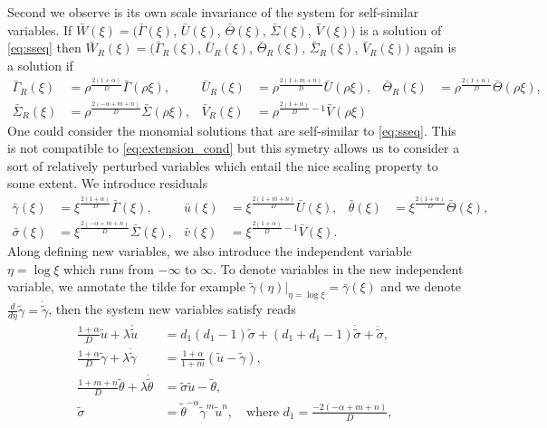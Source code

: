\documentclass[a4paper,11pt]{article}
\def\blue{\color{blue}}
\def\bG{{\bar{\Gamma}}}
\def\bV{{\bar{V}}}
\def\bTh{{\bar{\Theta}}}
\def\bS{{\bar{\Sigma}}}
\def\bU{{\bar{U}}}
\def\bg{{\bar{\gamma}}}
\def\bv{{\bar{v}}}
\def\bth{{\bar{\theta}}}
\def\bs{{\bar{\sigma}}}
\def\bu{{\bar{u}}}
\def\tg{{\tilde{\gamma}}}
\def\tth{{\tilde{\theta}}}
\def\ts{{\tilde{\sigma}}}
\def\tu{{\tilde{u}}}
\theoremstyle{remark}
\begin{document}
Second we observe is its own scale invariance of the system for self-similar variables. If $\bar{W}(\xi)=\big(\bG(\xi)$, $\bU(\xi)$, $\bTh(\xi)$, $\bS(\xi)$, $\bV(\xi)\big)$ is a solution of \eqref{eq:sseq} then $\bar{W}_R(\xi)=\big(\bG _R(\xi)$, $\bU_R(\xi)$, $\bTh_R(\xi)$, $\bS_R(\xi)$, $\bV_R(\xi)\big)$ again is a solution if
{\blue
\begin{align*}
\bG _R(\xi)&=\rho^ \frac{2(1+ \alpha)}{D}\bG(\rho\xi), & \bU _R(\xi) &= \rho^ \frac{2(1+ m+n)}{D}\bU(\rho\xi), & 
\bTh _R(\xi)&=\rho^ \frac{2(1+ \alpha)}{D}\bTh(\rho\xi), \\
\bS _R(\xi)&=\rho^ \frac{2(-\alpha+m+n)}{D}\bS(\rho\xi), & \bV _R(\xi) &=\rho^ {\frac{2(1+ \alpha)}{D}-1}\bV(\rho\xi)
\end{align*}
}
One could consider the monomial solutions that are self-similar to \eqref{eq:sseq}. This is not compatible to \eqref{eq:extension_cond} but this symetry allows us to consider a sort of relatively perturbed variables which entail the nice scaling property to some extent. We introduce residuals 
\begin{align*}
\bg(\xi) &= \xi^ \frac{2(1+ \alpha)}{D}\bG(\xi), & \bu(\xi) &= \xi^ \frac{2(1+ m+n)}{D}\bU(\xi), & 
\bth(\xi)&=\xi^ \frac{2(1+ \alpha)}{D}\bTh(\xi), \\
\bs(\xi)&=\xi^ \frac{2(-\alpha+m+n)}{D}\bS(\xi), & \bv(\xi) &=\xi^ {\frac{2(1+ \alpha)}{D}-1}\bV(\xi).
\end{align*}
Along defining new variables, we also introduce the independent variable $\eta = \log\xi$ which runs from $-\infty$ to $\infty$. To denote variables in the new independent variable, we annotate the tilde for example $\tg(\eta)|_{\eta=\log\xi}=\bg(\xi)$ and we denote $\frac{d}{d\eta} \tg = \dot\tg$, then the system new variables satisfy reads 
\begin{equation} \label{eq:tildesys}
\begin{aligned}
\frac{1+ \alpha}{D} \tu + \lambda \dot\tu &= d_1(d_1-1)\ts + (d_1+d_1-1)\dot\ts + \ddot\ts,\\
\frac{1+ \alpha}{D} \tg + \lambda \dot\tg &= \frac{1 + \alpha}{1+m}( \tu - \tg ),\\
\frac{1+ m+n}{D} \tth + \lambda \dot\tth &= \ts\tu-\tth,\\
\ts &=\tth^{- \alpha} \tg ^m \tu ^n, \quad \text{where $d_1=\frac{-2(- \alpha +m+n)}{D}$},
\end{aligned}
\end{equation}
\end{document}
